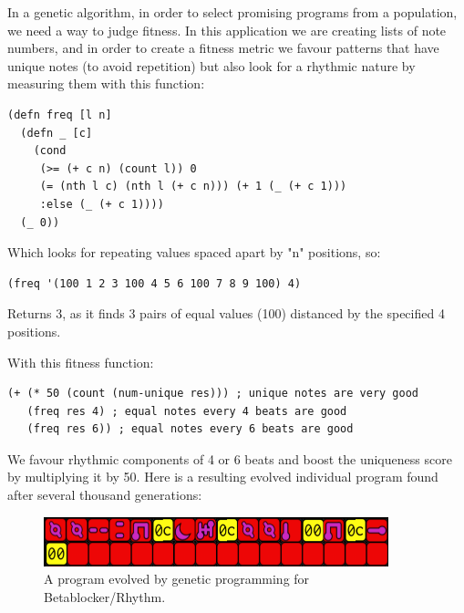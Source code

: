 \documentclass[letterpaper, 12pt]{article}
\begin{document}
In a genetic algorithm, in order to select promising programs from a population, we need a way to judge fitness. In this application we are creating lists of note numbers, and in order to create a fitness metric we favour patterns that have unique notes (to avoid repetition) but also look for a rhythmic nature by measuring them with this function:

\begin{Verbatim}[fontfamily=courier, xleftmargin=\parindent]
(defn freq [l n]
  (defn _ [c]
    (cond
     (>= (+ c n) (count l)) 0
     (= (nth l c) (nth l (+ c n))) (+ 1 (_ (+ c 1)))
     :else (_ (+ c 1))))
  (_ 0))
\end{Verbatim}

Which looks for repeating values spaced apart by "n" positions, so:

\begin{Verbatim}[fontfamily=courier, xleftmargin=\parindent]
(freq '(100 1 2 3 100 4 5 6 100 7 8 9 100) 4) 
\end{Verbatim}

Returns 3, as it finds 3 pairs of equal values (100) distanced by the specified 4 positions.

With this fitness function:

\begin{Verbatim}[fontfamily=courier, xleftmargin=\parindent]
(+ (* 50 (count (num-unique res))) ; unique notes are very good
   (freq res 4) ; equal notes every 4 beats are good
   (freq res 6)) ; equal notes every 6 beats are good
\end{Verbatim}

We favour rhythmic components of 4 or 6 beats and boost the uniqueness score by multiplying it by 50. Here is a resulting evolved individual program found after several thousand generations:

\begin{figure}[H]
	\centering
		\includegraphics[width=10cm]{evolved}
	\caption{A program evolved by genetic programming for Betablocker/Rhythm.}
	\label{fig:evolved}
\end{figure}
\end{document}
